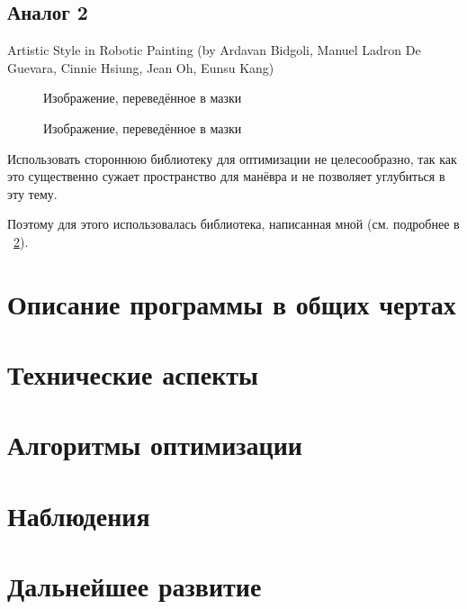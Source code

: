 \documentclass[11pt]{article}
\begin{document}
    \FloatBarrier

    \subsection{Аналог 2}
    Artistic Style in Robotic Painting (by Ardavan Bidgoli, Manuel Ladron De Guevara, Cinnie Hsiung, Jean Oh, Eunsu Kang)

    \begin{figure}[h!]
        \centering
        \caption{Изображение, переведённое в мазки}
        \label{fig:initial_bidgoli}
    \end{figure}

    \begin{figure}[h!]
        \centering
        \caption{Изображение, переведённое в мазки}
        \label{fig:result_bidgoli}
    \end{figure}

    \FloatBarrier




    Использовать стороннюю библиотеку для оптимизации не целесообразно,
    так как это существенно сужает пространство для манёвра и не позволяет
    углубиться в эту тему.

    Поэтому для этого использовалась библиотека, написанная мной (см. подробнее в ~\ref{sec:tecnical}).

    \section{Описание программы в общих чертах}\label{sec:general_description}
    

    \section{Технические аспекты}\label{sec:tecnical}
    

    \section {Алгоритмы оптимизации}\label{sec:opimization_algorithms}
    

    \section{Наблюдения}\label{sec:observations}
    

    \section{Дальнейшее развитие}\label{sec:todo}
    
\end{document}
